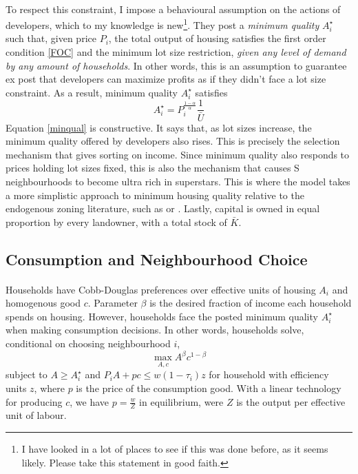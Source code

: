 \documentclass[]{article}
\theoremstyle{plain}
\begin{document}
\paragraph*{}
To respect this constraint, I impose a behavioural assumption on the actions of developers, which to my knowledge is new\footnote{I have looked in a lot of places to see if this was done before, as it seems likely. Please take this statement in good faith.}. They post a \textit{minimum quality} $A_{i}^{\star}$ such that, given price $P_{i}$, the total output of housing satisfies the first order condition \eqref{FOC} and the minimum lot size restriction, \textit{given any level of demand by any amount of households}. In other words, this is an assumption to guarantee ex post that developers can maximize profits as if they didn't face a lot size constraint. As a result, minimum quality $A_{i}^{\star}$ satisfies
\begin{equation}\label{minqual}
	A_{i}^{\star} = P_{i}^{\frac{1 - \alpha}{\alpha}}\frac{1}{\bar{U}}
\end{equation}
Equation \eqref{minqual} is constructive. It says that, as  lot sizes increase, the minimum quality offered by developers also rises. This is precisely the selection mechanism that gives sorting on income. Since minimum quality also responds to prices holding lot sizes fixed, this is also the mechanism that causes S neighbourhoods to become ultra rich in superstars. This is where the model takes a more simplistic approach to minimum housing quality relative to the endogenous zoning literature, such as \citet{calabresetal} or \citet{keepingpeopleout}. Lastly, capital is owned in equal proportion by every landowner, with a total stock of $\bar{K}$.

\subsection{Consumption and Neighbourhood Choice}
\paragraph*{}
Households have Cobb-Douglas preferences over effective units of housing $A_{i}$ and homogenous good $c$. Parameter $\beta$ is the desired fraction of income each household spends on housing. However, households face the posted minimum quality $A_{i}^{\star}$ when making consumption decisions. In other words, households solve, conditional on choosing neighbourhood $i$,
\begin{equation}\label{utility}
\max_{A, c} A^{\beta}c^{1-\beta}
\end{equation} 
subject to $A \geq A_{i}^{\star}$ and $P_{i}A + pc \leq w(1-\tau_{i})z$ for household with efficiency units $z$, where $p$ is the price of the consumption good. With a linear technology for producing $c$, we have $p = \frac{w}{Z}$ in equilibrium, were $Z$ is the output per effective unit of labour. 
\end{document}
